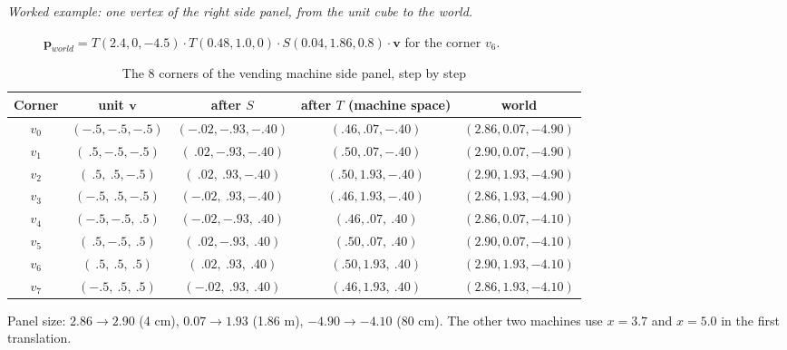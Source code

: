 \emph{Worked example: one vertex of the right side panel, from the unit cube to the world.}
\begin{figure}[H]
\centering
{}
\caption{$\mathbf{p}_{world}=T(2.4,0,-4.5)\cdot T(0.48,1.0,0)\cdot S(0.04,1.86,0.8)\cdot\mathbf{v}$ for the corner $v_6$.}\label{fig:vendpipe}
\end{figure}
\begin{table}[H]
\centering\small
\caption{The 8 corners of the vending machine side panel, step by step}\label{tab:vendcorners}
\begin{tabular}{@{}c c c c c@{}}
\toprule
Corner & unit $\mathbf{v}$ & after $S$ & after $T$ (machine space) & world \\ \midrule
$v_0$ & $(-.5,-.5,-.5)$ & $(-.02,-.93,-.40)$ & $(.46,.07,-.40)$ & $(2.86,0.07,-4.90)$ \\
$v_1$ & $(\ .5,-.5,-.5)$ & $(\ .02,-.93,-.40)$ & $(.50,.07,-.40)$ & $(2.90,0.07,-4.90)$ \\
$v_2$ & $(\ .5,\ .5,-.5)$ & $(\ .02,\ .93,-.40)$ & $(.50,1.93,-.40)$ & $(2.90,1.93,-4.90)$ \\
$v_3$ & $(-.5,\ .5,-.5)$ & $(-.02,\ .93,-.40)$ & $(.46,1.93,-.40)$ & $(2.86,1.93,-4.90)$ \\
$v_4$ & $(-.5,-.5,\ .5)$ & $(-.02,-.93,\ .40)$ & $(.46,.07,\ .40)$ & $(2.86,0.07,-4.10)$ \\
$v_5$ & $(\ .5,-.5,\ .5)$ & $(\ .02,-.93,\ .40)$ & $(.50,.07,\ .40)$ & $(2.90,0.07,-4.10)$ \\
$v_6$ & $(\ .5,\ .5,\ .5)$ & $(\ .02,\ .93,\ .40)$ & $(.50,1.93,\ .40)$ & $(2.90,1.93,-4.10)$ \\
$v_7$ & $(-.5,\ .5,\ .5)$ & $(-.02,\ .93,\ .40)$ & $(.46,1.93,\ .40)$ & $(2.86,1.93,-4.10)$ \\
\bottomrule
\end{tabular}
\end{table}
Panel size: $2.86\to2.90$ (4 cm), $0.07\to1.93$ (1.86 m), $-4.90\to-4.10$ (80 cm). The other two machines
use $x=3.7$ and $x=5.0$ in the first translation.


